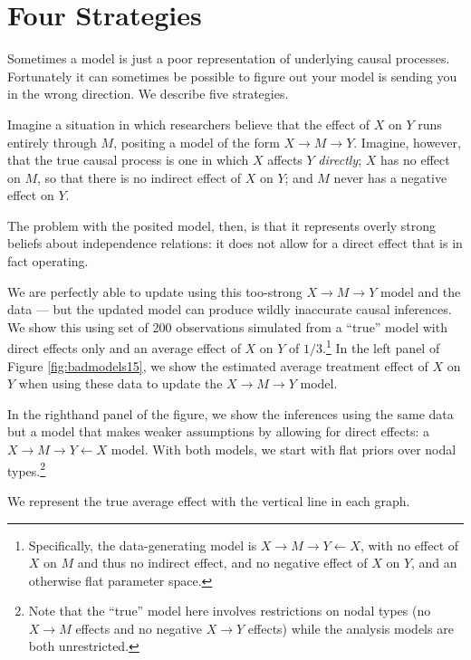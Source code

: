 \documentclass[
  12pt,
]{book}
\begin{document}
\hypertarget{four-strategies}{%
\section{Four Strategies}\label{four-strategies}}

Sometimes a model is just a poor representation of underlying causal processes. Fortunately it can sometimes be possible to figure out your model is sending you in the wrong direction. We describe five strategies.

Imagine a situation in which researchers believe that the effect of \(X\) on \(Y\) runs entirely through \(M\), positing a model of the form \(X \rightarrow M \rightarrow Y\). Imagine, however, that the true causal process is one in which \(X\) affects \(Y\) \emph{directly}; \(X\) has no effect on \(M\), so that there is no indirect effect of \(X\) on \(Y\); and \(M\) never has a negative effect on \(Y\).

The problem with the posited model, then, is that it represents overly strong beliefs about independence relations: it does not allow for a direct effect that is in fact operating.

We are perfectly able to update using this too-strong \(X \rightarrow M \rightarrow Y\) model and the data --- but the updated model can produce wildly inaccurate causal inferences. We show this using set of 200 observations simulated from a ``true'' model with direct effects only and an average effect of \(X\) on \(Y\) of \(1/3\).\footnote{Specifically, the data-generating model is \(X \rightarrow M \rightarrow Y \leftarrow X\), with no effect of \(X\) on \(M\) and thus no indirect effect, and no negative effect of \(X\) on \(Y\), and an otherwise flat parameter space.} In the left panel of Figure \ref{fig:badmodels15}, we show the estimated average treatment effect of \(X\) on \(Y\) when using these data to update the \(X \rightarrow M \rightarrow Y\) model.

In the righthand panel of the figure, we show the inferences using the same data but a model that makes weaker assumptions by allowing for direct effects: a \(X \rightarrow M \rightarrow Y \leftarrow X\) model. With both models, we start with flat priors over nodal types.\footnote{Note that the ``true'' model here involves restrictions on nodal types (no \(X \rightarrow M\) effects and no negative \(X \rightarrow Y\) effects) while the analysis models are both unrestricted.}

We represent the true average effect with the vertical line in each graph.
\end{document}
